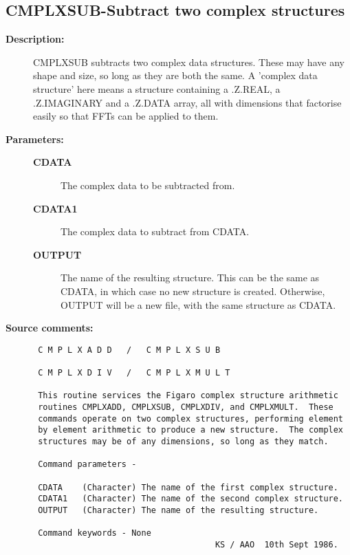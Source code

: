 \subsection{CMPLXSUB-\label{CMPLXSUB}Subtract two complex structures}
\begin{description}

\item [{\bf Description:}]
 CMPLXSUB  subtracts two complex data  structures.  These  may
 have any shape and size, so long as they are both the same.  A
 'complex data structure' here means a structure containing a
 .Z.REAL, a .Z.IMAGINARY and a .Z.DATA array, all with dimensions
 that factorise easily so that FFTs can be applied to them.

\item [{\bf Parameters:}]
\begin{description}
\item [{\bf CDATA}]
 The complex data to be subtracted from.
\item [{\bf CDATA1}]
 The complex data to subtract from CDATA.
\item [{\bf OUTPUT}]
 The name of the resulting structure. This can be the same as
 CDATA, in which case no new structure is created.  Otherwise,
 OUTPUT will be a new file, with the same structure as CDATA.
\end{description}

\item [{\bf Source comments:}]
\begin{verbatim}
 C M P L X A D D   /   C M P L X S U B

 C M P L X D I V   /   C M P L X M U L T

 This routine services the Figaro complex structure arithmetic
 routines CMPLXADD, CMPLXSUB, CMPLXDIV, and CMPLXMULT.  These
 commands operate on two complex structures, performing element
 by element arithmetic to produce a new structure.  The complex
 structures may be of any dimensions, so long as they match.

 Command parameters -

 CDATA    (Character) The name of the first complex structure.
 CDATA1   (Character) The name of the second complex structure.
 OUTPUT   (Character) The name of the resulting structure.

 Command keywords - None
                                     KS / AAO  10th Sept 1986.
\end{verbatim}
\end{description}
